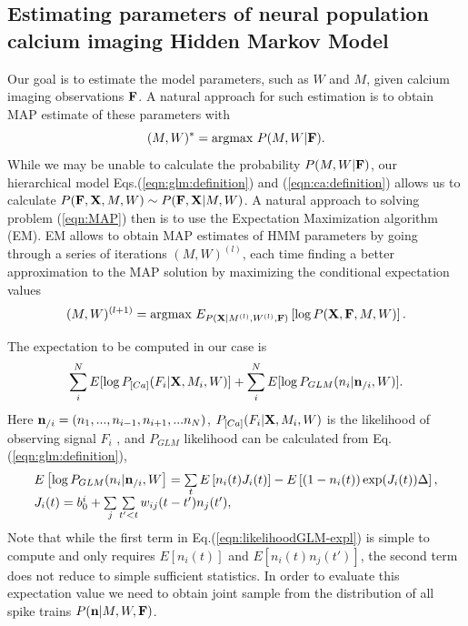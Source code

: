\documentclass[amsmath,amssymb]{revtex4}
\begin{document}
\subsection{\label{sec:methods:estimating_parameters}Estimating parameters of neural population calcium imaging Hidden Markov Model }
Our goal is to estimate the model parameters, such as $W$ and $M$, given calcium imaging observations ${\bf F}$. A natural approach for such estimation is to obtain MAP estimate of these parameters with
\begin{equation}\label{eqn:MAP}
(M,W)^*=\text{argmax } P(M,W|{\bf F}).
\end{equation}
While we may be unable to calculate the probability $P(M,W|{\bf F})$, our hierarchical model Eqs.(\ref{eqn:glm:definition}) and (\ref{eqn:ca:definition}) allows us to calculate $P({\bf F},{\bf X},M,W)\sim P({\bf F},{\bf X}|M,W)$. A natural approach to solving problem (\ref{eqn:MAP}) then is to use the Expectation Maximization algorithm (EM).
EM allows to obtain MAP estimates of HMM parameters by going through a series of iterations $(M,W)^{(l)}$, each time finding a better approximation to the MAP solution by maximizing the conditional expectation values
\begin{equation}
(M,W)^{(l+1)}=\text{argmax }E_{P({\bf X}|M^{(l)},W^{(l)},{\bf F})}\left[\log P({\bf X},{\bf F},M,W)\right].
\end{equation}

The expectation to be computed in our case is
\begin{equation}\label{eqn:loglik:definition-expl}
\sum_i^N E[\log P_{[Ca]}(F_i|{\bf X},M_i,W)] + \sum_i^N E[\log P_{GLM}(n_i|{\bf n}_{/i},W)].
\end{equation}
Here ${\bf n}_{/i}=(n_1,...,n_{i-1},n_{i+1},...n_N)$, $P_{[Ca]}(F_i|{\bf X},M_i,W)$ is the likelihood of observing signal $F_i$ \cite{Vogelstein2009}, and $P_{GLM}$ likelihood can be calculated from Eq.(\ref{eqn:glm:definition}),
\begin{equation}\label{eqn:likelihoodGLM-expl}
\begin{array}{l}
E\left[\log P_{GLM}(n_i|{\bf n}_{/i},W\right]=\sum\limits_t E \left[ n_i(t) J_i(t)\right] - E\left[(1-n_i(t)) \exp(J_i(t)) \Delta \right],\\
J_i(t)=b_0^i+\sum\limits_{j} \sum\limits_{t'<t} w_{ij}(t-t')n_{j}(t'),
\end{array}
\end{equation}
Note that while the first term in Eq.(\ref{eqn:likelihoodGLM-expl}) is simple to compute and only requires $E[n_i(t)]$ and $E[n_i(t) n_{j}(t')]$, the second term does not reduce to simple sufficient statistics. In order to evaluate this expectation value we need to obtain joint sample from the distribution of all spike trains $P({\bf n}|M,W,{\bf F})$.
\end{document}
